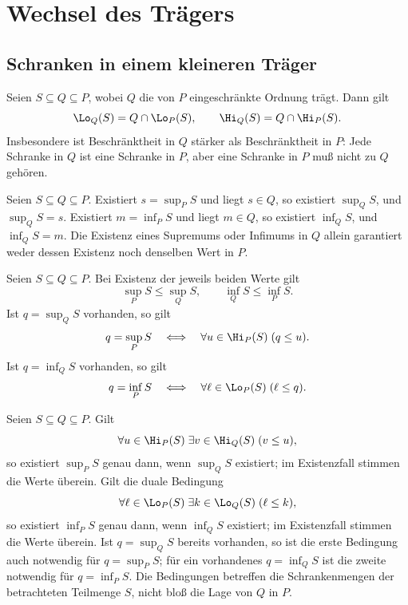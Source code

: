 \chapter{Wechsel des Trägers}
\label{b13guide:ch:ambient}

\section{Schranken in einem kleineren Träger}

\begin{theorem}
\label{b13guide:thm:restriction}
Seien $S\subseteq Q\subseteq P$, wobei $Q$ die von $P$
eingeschränkte Ordnung trägt. Dann gilt
\[
 \Lo_Q(S)=Q\cap\Lo_P(S),\qquad
 \Hi_Q(S)=Q\cap\Hi_P(S).
\]
Insbesondere ist Beschränktheit in $Q$ stärker als Beschränktheit
in $P$: Jede Schranke in $Q$ ist eine Schranke in $P$, aber eine
Schranke in $P$ muß nicht zu $Q$ gehören.
\end{theorem}

\begin{theorem}
\label{b13guide:thm:inheritance}
Seien $S\subseteq Q\subseteq P$. Existiert $s=\sup_P S$ und liegt
$s\in Q$, so existiert $\sup_Q S$, und $\sup_Q S=s$.
Existiert $m=\inf_P S$ und liegt $m\in Q$, so existiert $\inf_Q S$,
und $\inf_Q S=m$.
Die Existenz eines Supremums oder Infimums in $Q$ allein garantiert
weder dessen Existenz noch denselben Wert in $P$.
\end{theorem}

\begin{theorem}
\label{b13guide:thm:ambient-comparison}
Seien $S\subseteq Q\subseteq P$. Bei Existenz der jeweils beiden
Werte gilt
\[
 \sup_P S\leq\sup_Q S,\qquad \inf_Q S\leq\inf_P S.
\]
Ist $q=\sup_Q S$ vorhanden, so gilt
\[
 q=\sup_P S\quad\Longleftrightarrow\quad
       \forall u\in\Hi_P(S)\;(q\leq u).
\]
Ist $q=\inf_Q S$ vorhanden, so gilt
\[
 q=\inf_P S\quad\Longleftrightarrow\quad
       \forall \ell\in\Lo_P(S)\;(\ell\leq q).
\]
\end{theorem}


\begin{theorem}
\label{b13guide:thm:ambient-cofinal}
Seien $S\subseteq Q\subseteq P$. Gilt
\[
 \forall u\in\Hi_P(S)\;\exists v\in\Hi_Q(S)\;(v\leq u),
\]
so existiert $\sup_P S$ genau dann, wenn $\sup_Q S$ existiert;
im Existenzfall stimmen die Werte überein. Gilt die duale Bedingung
\[
 \forall\ell\in\Lo_P(S)\;\exists k\in\Lo_Q(S)\;(\ell\leq k),
\]
so existiert $\inf_P S$ genau dann, wenn $\inf_Q S$ existiert;
im Existenzfall stimmen die Werte überein.
Ist $q=\sup_Q S$ bereits vorhanden, so ist die erste Bedingung
auch notwendig für $q=\sup_P S$; für ein vorhandenes $q=\inf_Q S$
ist die zweite notwendig für $q=\inf_P S$.
Die Bedingungen betreffen die Schrankenmengen der betrachteten
Teilmenge $S$, nicht bloß die Lage von $Q$ in $P$.
\end{theorem}

